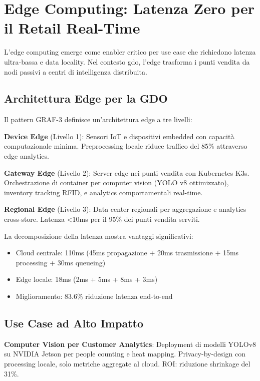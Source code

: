 \section{\texorpdfstring{Edge Computing: Latenza Zero per il Retail Real-Time}{3.4 - Edge Computing: Latenza Zero per il Retail Real-Time}}
\label{sec:edge_computing}

L'edge computing emerge come enabler critico per use case che richiedono latenza ultra-bassa e data locality. Nel contesto \gls{gdo}, l'edge trasforma i punti vendita da nodi passivi a centri di intelligenza distribuita.

\subsection{\texorpdfstring{Architettura Edge per la GDO}{3.4.1 - Architettura Edge per la GDO}}

Il pattern GRAF-3 definisce un'architettura edge a tre livelli:

\textbf{Device Edge} (Livello 1): Sensori IoT e dispositivi embedded con capacità computazionale minima. Preprocessing locale riduce traffico del 85\% attraverso edge analytics.

\textbf{Gateway Edge} (Livello 2): Server edge nei punti vendita con Kubernetes K3s. Orchestrazione di container per computer vision (YOLO v8 ottimizzato), inventory tracking RFID, e analytics comportamentali real-time.

\textbf{Regional Edge} (Livello 3): Data center regionali per aggregazione e analytics cross-store. Latenza <10ms per il 95\% dei punti vendita serviti.

La decomposizione della latenza mostra vantaggi significativi:
\begin{itemize}
\item Cloud centrale: 110ms (45ms propagazione + 20ms trasmissione + 15ms processing + 30ms queueing)
\item Edge locale: 18ms (2ms + 5ms + 8ms + 3ms)
\item Miglioramento: 83.6\% riduzione latenza end-to-end
\end{itemize}

\subsection{\texorpdfstring{Use Case ad Alto Impatto}{3.4.2 - Use Case ad Alto Impatto}}

\textbf{Computer Vision per Customer Analytics}: Deployment di modelli YOLOv8 su NVIDIA Jetson per people counting e heat mapping. Privacy-by-design con processing locale, solo metriche aggregate al cloud. ROI: riduzione shrinkage del 31\%.

